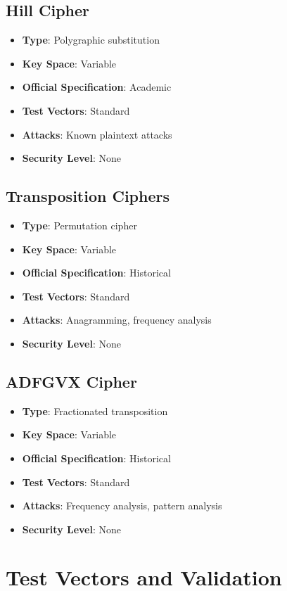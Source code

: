 \documentclass[11pt,a4paper]{article}
\begin{document}
\subsection{Hill Cipher}
\begin{itemize}
    \item \textbf{Type}: Polygraphic substitution
    \item \textbf{Key Space}: Variable
    \item \textbf{Official Specification}: Academic
    \item \textbf{Test Vectors}: Standard
    \item \textbf{Attacks}: Known plaintext attacks
    \item \textbf{Security Level}: None
\end{itemize}

\subsection{Transposition Ciphers}
\begin{itemize}
    \item \textbf{Type}: Permutation cipher
    \item \textbf{Key Space}: Variable
    \item \textbf{Official Specification}: Historical
    \item \textbf{Test Vectors}: Standard
    \item \textbf{Attacks}: Anagramming, frequency analysis
    \item \textbf{Security Level}: None
\end{itemize}

\subsection{ADFGVX Cipher}
\begin{itemize}
    \item \textbf{Type}: Fractionated transposition
    \item \textbf{Key Space}: Variable
    \item \textbf{Official Specification}: Historical
    \item \textbf{Test Vectors}: Standard
    \item \textbf{Attacks}: Frequency analysis, pattern analysis
    \item \textbf{Security Level}: None
\end{itemize}

\section{Test Vectors and Validation}
\end{document}
